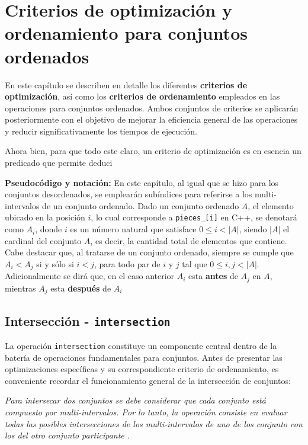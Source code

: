 \chapter{Criterios de optimización y ordenamiento para conjuntos ordenados}

En este capítulo se describen en detalle los diferentes \textbf{criterios de optimización}, así como los \textbf{criterios de ordenamiento} empleados en las operaciones para conjuntos ordenados. Ambos conjuntos de criterios se aplicarán posteriormente con el objetivo de mejorar la eficiencia general de las operaciones y reducir significativamente los tiempos de ejecución.

Ahora bien, para que todo este claro, un criterio de optimización es en esencia un predicado que permite deduci

\textbf{Pseudocódigo y notación:} En este capítulo, al igual que se hizo para los conjuntos desordenados, se emplearán subíndices para referirse a los multi-intervalos de un conjunto ordenado. Dado un conjunto ordenado $A$, el elemento ubicado en la posición $i$, lo cual corresponde a \texttt{pieces\_[i]} en C++, se denotará como \textbf{$A_i$}, donde $i$ es un número natural que satisface $0 \leq i < |A|$, siendo $|A|$ el cardinal del conjunto $A$, es decir, la cantidad total de elementos que contiene. Cabe destacar que, al tratarse de un conjunto ordenado, siempre se cumple que $A_i < A_j$ si y sólo si $i < j$, para todo par de $i$ y $j$ tal que $0  \leq i, j < |A|$. Adicionalmente se dirá que, en el caso anterior $A_i$ esta \textbf{antes} de $A_j$ en $A$, mientras $A_j$ esta \textbf{después} de $A_i$

\section{Intersección - \texttt{intersection}}

La operación \texttt{intersection} constituye un componente central dentro de la batería de operaciones fundamentales para conjuntos. Antes de presentar las optimizaciones específicas y su correspondiente criterio de ordenamiento, es conveniente recordar el funcionamiento general de la intersección de conjuntos:

\begin{center}
\textit{Para intersecar dos conjuntos se debe considerar que cada conjunto está compuesto por multi-intervalos. Por lo tanto, la operación consiste en evaluar todas las posibles intersecciones de los multi-intervalos de uno de los conjunto con los del otro conjunto participante .}
\end{center}

